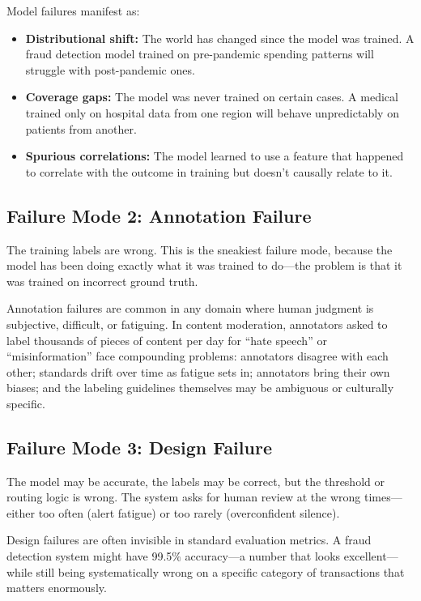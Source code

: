 Model failures manifest as:
\begin{itemize}
    \item \textbf{Distributional shift:} The world has changed since the model was trained. A fraud detection model trained on pre-pandemic spending patterns will struggle with post-pandemic ones.
    \item \textbf{Coverage gaps:} The model was never trained on certain cases. A medical \ai trained only on hospital data from one region will behave unpredictably on patients from another.
    \item \textbf{Spurious correlations:} The model learned to use a feature that happened to correlate with the outcome in training but doesn't causally relate to it.
\end{itemize}

\subsection{Failure Mode 2: Annotation Failure}

The training labels are wrong. This is the sneakiest failure mode, because the model has been doing exactly what it was trained to do---the problem is that it was trained on incorrect ground truth.

Annotation failures are common in any domain where human judgment is subjective, difficult, or fatiguing. In content moderation, annotators asked to label thousands of pieces of content per day for ``hate speech'' or ``misinformation'' face compounding problems: annotators disagree with each other; standards drift over time as fatigue sets in; annotators bring their own biases; and the labeling guidelines themselves may be ambiguous or culturally specific.

\subsection{Failure Mode 3: Design Failure}

The model may be accurate, the labels may be correct, but the threshold or routing logic is wrong. The system asks for human review at the wrong times---either too often (alert fatigue) or too rarely (overconfident silence).

Design failures are often invisible in standard evaluation metrics. A fraud detection system might have 99.5\% accuracy---a number that looks excellent---while still being systematically wrong on a specific category of transactions that matters enormously.

